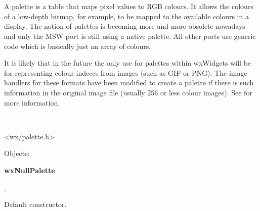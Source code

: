 
\section{}\label{wxpalette}

A palette is a table that maps pixel values to RGB colours. It allows the
colours of a low-depth bitmap, for example, to be mapped to the available
colours in a display. The notion of palettes is becoming more and more
obsolete nowadays and only the MSW port is still using a native palette.
All other ports use generic code which is basically just an array of
colours. 

It is likely that in the future the only use for palettes within wxWidgets
will be for representing colour indeces from images (such as GIF or PNG).
The image handlers for these formats have been modified to create a palette
if there is such information in the original image file (usually 256 or less
colour images). See  for more information.


\\


<wx/palette.h>


Objects:

{\bf wxNullPalette}


, 


\label{wxpalettector}


Default constructor.


